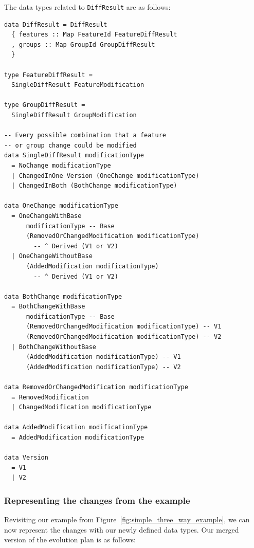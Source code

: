 \documentclass[a4paper,english]{ifimaster}
\begin{document}
The data types related to \texttt{DiffResult} are as follows:

\begin{verbatim}
data DiffResult = DiffResult
  { features :: Map FeatureId FeatureDiffResult
  , groups :: Map GroupId GroupDiffResult
  }

type FeatureDiffResult =
  SingleDiffResult FeatureModification

type GroupDiffResult =
  SingleDiffResult GroupModification

-- Every possible combination that a feature
-- or group change could be modified
data SingleDiffResult modificationType
  = NoChange modificationType
  | ChangedInOne Version (OneChange modificationType)
  | ChangedInBoth (BothChange modificationType)

data OneChange modificationType
  = OneChangeWithBase
      modificationType -- Base
      (RemovedOrChangedModification modificationType)
        -- ^ Derived (V1 or V2)
  | OneChangeWithoutBase
      (AddedModification modificationType) 
        -- ^ Derived (V1 or V2)

data BothChange modificationType
  = BothChangeWithBase
      modificationType -- Base
      (RemovedOrChangedModification modificationType) -- V1
      (RemovedOrChangedModification modificationType) -- V2
  | BothChangeWithoutBase
      (AddedModification modificationType) -- V1
      (AddedModification modificationType) -- V2

data RemovedOrChangedModification modificationType
  = RemovedModification
  | ChangedModification modificationType

data AddedModification modificationType
  = AddedModification modificationType

data Version
  = V1
  | V2
\end{verbatim}

\subsubsection{Representing the changes from the example}%
\label{ssub:representing_the_changes_from_the_example}

Revisiting our example from Figure~\ref{fig:simple_three_way_example}, we can now represent the changes with our newly defined data types. Our merged version of the evolution plan is as follows:
\end{document}
